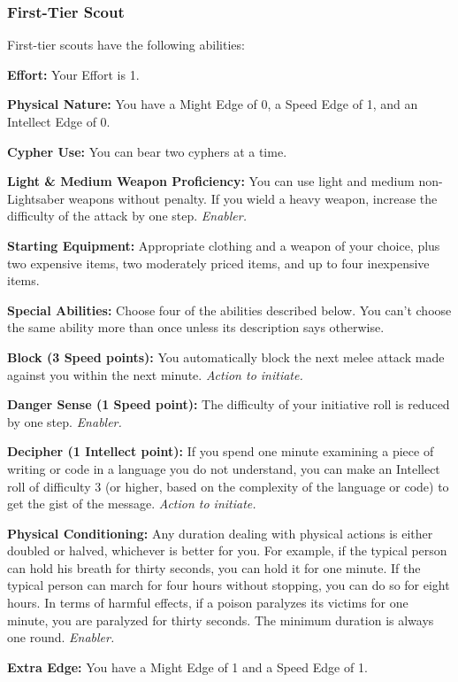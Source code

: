 \documentclass[a4paper,10pt,final,twocolumn,oneside]{book}
\newcommand{\itemLine}[2]{\textbf{#1:}{ #2}\par}
\newcommand{\itemAbility}[2]{\textcolor{25gray}{\textbullet\textbf{ #1:}}{ #2}\par}
\newcommand{\enabler}{\textit{ Enabler.}}
\newcommand{\actionInit}{\textit{ Action to initiate.}}
\begin{document}

\subsubsection*{First-Tier Scout}
\label{subsub:scoutFirstTier}

First-tier scouts have the following abilities: \par

\itemLine{Effort}{Your Effort is 1.}

\itemLine{Physical Nature}{You have a Might Edge of 0, a Speed Edge of 1, and an Intellect Edge of 0.}

\itemLine{Cypher Use}{You can bear two cyphers at a time.}

\itemLine{Light \& Medium Weapon Proficiency}{You can use light and medium non-Lightsaber weapons without penalty. If you wield a heavy weapon, increase the difficulty of the attack by one step.\enabler}

\itemLine{Starting Equipment}{Appropriate clothing and a weapon of your choice, plus two expensive items, two moderately priced items, and up to four inexpensive items.}

\itemLine{Special Abilities}{Choose four of the abilities described below. You can’t choose the same ability more than once unless its description says otherwise.}

\itemAbility{Block (3 Speed points)}{You automatically block the next melee attack made against you within the next minute.\actionInit}

\itemAbility{Danger Sense (1 Speed point)}{The difficulty of your initiative roll is reduced by one step.\enabler}

\itemAbility{Decipher (1 Intellect point)}{If you spend one minute examining a piece of writing or code in a language you do not understand, you can make an Intellect roll of difficulty 3 (or higher, based on the complexity of the language or code) to get the gist of the message.\actionInit}

\itemAbility{Physical Conditioning}{Any duration dealing with physical actions is either doubled or halved, whichever is better for you. For example, if the typical person can hold his breath for thirty seconds, you can hold it for one minute. If the typical person can march for four hours without stopping, you can do so for eight hours. In terms of harmful effects, if a poison paralyzes its victims for one minute, you are paralyzed for thirty seconds. The minimum duration is always one round.\enabler} \itemAbility{Extra Edge}{You have a Might Edge of 1 and a Speed Edge of 1.}
\end{document}

